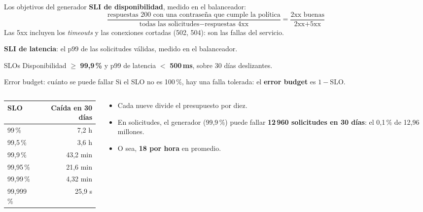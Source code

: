 \documentclass[institutional,screen,none]{ua-engineering-v6-beamer}
\begin{document}
\begin{frame}{Los objetivos del generador}
\textbf{SLI de disponibilidad}, medido en el balanceador:
\[
\frac{\text{respuestas 200 con una contraseña que cumple la política}}{\text{todas las solicitudes} - \text{respuestas 4xx}} = \frac{\text{2xx buenas}}{\text{2xx} + \text{5xx}}
\]
{\small Las 5xx incluyen los \emph{timeouts} y las conexiones cortadas (502, 504): son las fallas del servicio.}

\pause

\textbf{SLI de latencia}: el p99 de las solicitudes válidas, medido en el balanceador.

\pause

\begin{block}{SLOs}
Disponibilidad $\ge$ \textbf{99,9\,\%} y p99 de latencia $<$ \textbf{500\,ms}, sobre 30 días deslizantes.
\end{block}

\end{frame}


\begin{frame}{Error budget: cuánto se puede fallar}
Si el SLO no es 100\,\%, hay una falla tolerada: el \textbf{error budget} es $1 - \text{SLO}$.

\begin{columns}[T,onlytextwidth]
\begin{column}{0.48\textwidth}
\begin{center}
\small
\begin{tabular}{lr}
\toprule
\textbf{SLO} & \textbf{Caída en 30 días} \\
\midrule
99\,\% & 7,2 h \\
99,5\,\% & 3,6 h \\
99,9\,\% & 43,2 min \\
99,95\,\% & 21,6 min \\
99,99\,\% & 4,32 min \\
99,999\,\% & 25,9 s \\
\bottomrule
\end{tabular}
\end{center}
\end{column}
\begin{column}{0.48\textwidth}
\pause
\begin{itemize}\small
\item Cada nueve divide el presupuesto por diez.
\item En solicitudes, el generador (99,9\,\%) puede fallar \textbf{12\,960 solicitudes en 30 días}: el 0,1\,\% de 12,96 millones.
\item O sea, \textbf{18 por hora} en promedio.
\end{itemize}
\end{column}
\end{columns}
\end{frame}
\end{document}
